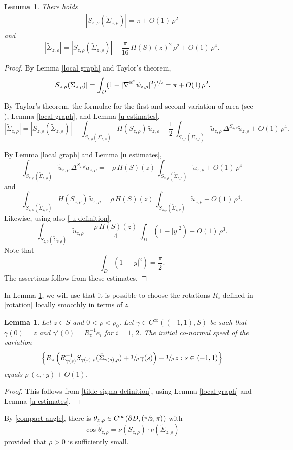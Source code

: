\documentclass[11pt]{amsart}
\newtheorem{lem}[prop]{Lemma}
\begin{document}
\begin{lem} \label{closeness}
	There holds 
	\begin{align*}
	|S_{z,\rho}(\tilde \Sigma_{z,\rho})|=\pi+O(1)\,\rho^2
	\end{align*} 
	and
	$$
	|\tilde \Sigma_{z,\rho}|=|S_{z,\rho}(\tilde \Sigma_{z,\rho})|-\frac{\pi}{16}\,H(S)(z)^2\,\rho^2+O(1)\,\rho^4.
	$$
	
\end{lem}
\begin{proof}
	By Lemma \ref{local graph} and Taylor's theorem,
	$$
	|S_{z,\rho}(\tilde \Sigma_{z,\rho})|=\int_{D}(1+|\nabla^{\mathbb{R}^2} \psi_{z,\rho}|^2)^{\sfrac12}=\pi+O(1)\,\rho^2.
	$$

	
	
	By  Taylor's theorem, the formulae for  the first and second variation of area (see \cite[Chapter 1, \S1 and \S8]{ColdingMinicozzi}), Lemma \ref{local graph}, and Lemma \ref{u estimates},
	$$
	|\tilde \Sigma_{z,\rho}|=|S_{z,\rho}(\tilde \Sigma_{z,\rho})|-\int_{S_{z,\rho}(\tilde \Sigma_{z,\rho})}H(S_{z,\rho})\,\tilde u_{z,\rho}-\frac12\,\int_{S_{z,\rho}(\tilde \Sigma_{z,\rho})} \tilde u_{z,\rho}\,\Delta^{S_{z,\rho}}\tilde u_{z,\rho}+O(1)\,\rho^4.	$$
	
	By Lemma \ref{local graph} and Lemma \ref{u estimates},
	$$
	\int_{S_{z,\rho}(\tilde \Sigma_{z,\rho})} \tilde u_{z,\rho}\,\Delta^{S_{z,\rho}}\tilde u_{z,\rho}=-\rho\,H(S)(z)\,\int_{S_{z,\rho}(\tilde \Sigma_{z,\rho})} \tilde u_{z,\rho}+O(1)\,\rho^{4}
	$$
and
	$$
	\int_{S_{z,\rho}(\tilde \Sigma_{z,\rho})}H(S_{z,\rho})\,\tilde u_{z,\rho}=\rho\,H(S)(z)\,\int_{S_{z,\rho}(\tilde \Sigma_{z,\rho})}\tilde  u_{z,\rho}+O(1)\,\rho^4.
	$$
Likewise, using also \eqref{ u definition},
	$$
	\int_{S_{z,\rho}(\tilde \Sigma_{z,\rho})} \tilde u_{z,\rho}=\frac{\rho\,H(S)(z)}{4}\,\int_D(1-|y|^2)+O(1)\,\rho^3.
	$$
Note that
	$$
	\int_D(1-|y|^2)=\frac{\pi}{2}.
	$$
	The assertions follow from these estimates.
\end{proof}
In Lemma \ref{initial co-normal}, we will use that it is possible to choose the rotations $R_z$ defined in \eqref{rotation} locally smoothly in terms of $z$.
\begin{lem}
Let $z\in S$ and $0<\rho<\rho_0$.  Let $\gamma\in C^\infty((-1,1),S)$ be such that   $\gamma(0)=z$ and $\gamma'(0)=R_z^{-1}e_i$ for $i=1,\,2$. The initial co-normal speed of the variation \label{initial co-normal} $$\left\{R_{z}\left(R_{\gamma(s)}^{-1}S_{\gamma(s),\rho}(\tilde \Sigma_{\gamma(s),\rho})+\sfrac1\rho\,\gamma(s)\right)-\sfrac1\rho\,z:s\in(-1,1)\right\}$$
equals $\rho\,(e_i\cdot y)+O(1)$. 
\end{lem}
\begin{proof}
This follows from \eqref{tilde sigma definition}, using	Lemma \ref{local graph} and Lemma \ref{u estimates}.
\end{proof}
By \eqref{compact angle}, there is  $\tilde \theta_{z,\rho}\in C^\infty(\partial D,(\sfrac{\pi}2,\pi))$ with $$\cos\tilde \theta_{z,\rho}=\nu(S_{z,\rho})\cdot \nu(\tilde \Sigma_{z,\rho})$$ provided that $\rho>0$ is sufficiently small. 
\end{document}
